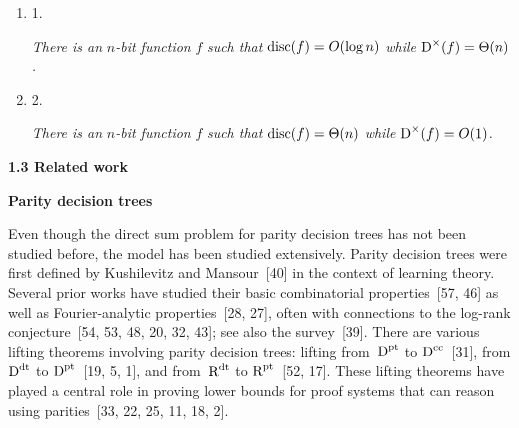 \documentclass[10pt,a4paper]{article}
\begin{document}
\begin{enumerate}


\item[] 
1. 


\emph{There is an }$n$\emph{-bit function }$f$\emph{ such that }${\textup{disc}}(f)=O(\log n)$\emph{ while }${\textup{D}}^{\times}(f)=\Theta(n)$\emph{.}\par





\item[] 
2. 


\emph{There is an }$n$\emph{-bit function }$f$\emph{ such that }${\textup{disc}}(f)=\Theta(n)$\emph{ while }${\textup{D}}^{\times}(f)=O(1)$\emph{.}\par





\end{enumerate}








\par\medskip\noindent\textbf{
1.3 Related work}\par




\par\medskip\noindent\textbf{Parity decision trees}\par




Even though the direct sum problem for parity decision trees has not been studied before, the model has been studied extensively.
Parity decision trees were first defined by Kushilevitz and Mansour [40] in the context of learning theory. Several prior works have studied their basic combinatorial properties [57, 46] as well as Fourier-analytic properties [28, 27], often with connections to the log-rank conjecture [54, 53, 48, 20, 32, 43]; see also the survey [39]. There are various lifting theorems involving parity decision trees: lifting from ${\textup{D}}^{\textup{pt}}$ to ${\textup{D}}^{\textup{cc}}$ [31], from ${\textup{D}}^{\textup{dt}}$ to ${\textup{D}}^{\textup{pt}}$ [19, 5, 1], and from ${\textup{R}}^{\textup{dt}}$ to ${\textup{R}}^{\textup{pt}}$ [52, 17]. These lifting theorems have played a central role in proving lower bounds for proof systems that can reason using parities [33, 22, 25, 11, 18, 2].\par
\end{document}
